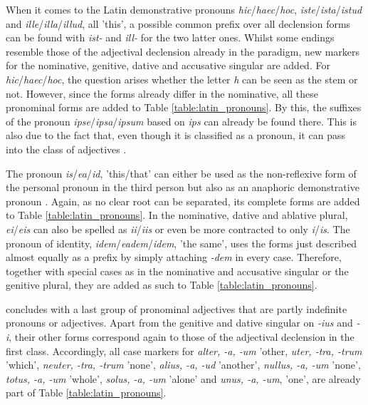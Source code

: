 \documentclass[11pt,a4paper,twoside,openright]{scrbook}
\begin{document}
When it comes to the Latin demonstrative pronouns \textit{hic}/\textit{haec}/\textit{hoc}, \textit{iste}/\textit{ista}/\textit{istud} and \textit{ille}/\textit{illa}/\textit{illud}, all 'this', a possible common prefix over all declension forms can be found with \textit{ist-} and \textit{ill-} for the two latter ones. Whilst some endings resemble those of the adjectival declension already in the paradigm, new markers for the nominative, genitive, dative and accusative singular are added. For  \textit{hic}/\textit{haec}/\textit{hoc}, the question arises whether the letter \textit{h} can be seen as the stem or not. However, since the forms already differ in the nominative, all these pronominal forms are added to Table \ref{table:latin_pronouns}. By this, the suffixes of the pronoun \textit{ipse}/\textit{ipsa}/\textit{ipsum} based on \textit{ips} can already be found there. This is also due to the fact that, even though it is classified as a pronoun, it can pass into the class of adjectives \citep{touratier2013lat}.

The pronoun \textit{is}/\textit{ea}/\textit{id}, 'this/that' can either be used as the non-reflexive form of the personal pronoun in the third person but also as an anaphoric demonstrative pronoun \citep{touratier2013lat}. Again, as no clear root can be separated, its complete forms are added to Table \ref{table:latin_pronouns}. In the nominative, dative and ablative plural, \textit{ei}/\textit{eis} can also be spelled as \textit{ii}/\textit{iis} or even be more contracted to only \textit{i}/\textit{is}. The pronoun of identity, \textit{idem}/\textit{eadem}/\textit{idem}, 'the same', uses the forms just described almost equally as a prefix by simply attaching \textit{-dem} in every case. Therefore, together with special cases as in the nominative and accusative singular or the genitive plural, they are added as such to Table \ref{table:latin_pronouns}.

\citep{touratier2013lat} concludes with a last group of pronominal adjectives that are partly indefinite pronouns or adjectives. Apart from the genitive and dative singular on \textit{-ius} and \textit{-i}, their other forms correspond again to those of the adjectival declension in the first class. Accordingly, all case markers for \textit{alter, -a, -um} 'other, \textit{uter, -tra, -trum} 'which', \textit{neuter, -tra, -trum} 'none', \textit{alius, -a, -ud} 'another', \textit{nullus, -a, -um} 'none', \textit{totus, -a, -um} 'whole', \textit{solus, -a, -um} 'alone' and \textit{unus, -a, -um}, 'one', are already part of Table \ref{table:latin_pronouns}.
\end{document}
